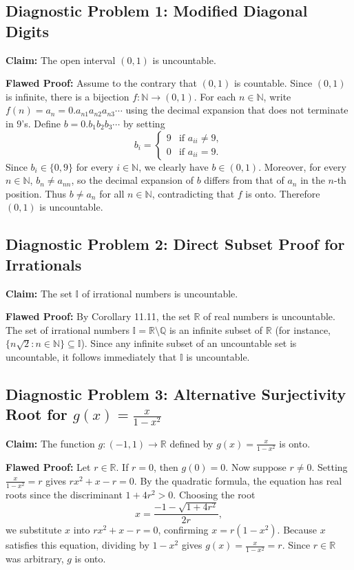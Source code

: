 \documentclass[11pt, letterpaper]{article}
\theoremstyle{definition}
\theoremstyle{remark}
\begin{document}
\subsection{Diagnostic Problem 1: Modified Diagonal Digits}

\textbf{Claim:} The open interval $(0, 1)$ is uncountable.

\textbf{Flawed Proof:}
Assume to the contrary that $(0, 1)$ is countable. Since $(0, 1)$ is infinite, there is a bijection $f : \mathbb{N} \to (0, 1)$. For each $n \in \mathbb{N}$, write $f(n) = a_n = 0.a_{n1} a_{n2} a_{n3} \cdots$ using the decimal expansion that does not terminate in $9$'s. Define $b = 0.b_1 b_2 b_3 \cdots$ by setting
\[
b_i = \begin{cases}
9 & \text{if } a_{ii} \neq 9, \\
0 & \text{if } a_{ii} = 9.
\end{cases}
\]
Since $b_i \in \{0, 9\}$ for every $i \in \mathbb{N}$, we clearly have $b \in (0, 1)$. Moreover, for every $n \in \mathbb{N}$, $b_n \neq a_{nn}$, so the decimal expansion of $b$ differs from that of $a_n$ in the $n$-th position. Thus $b \neq a_n$ for all $n \in \mathbb{N}$, contradicting that $f$ is onto. Therefore $(0, 1)$ is uncountable.

\subsection{Diagnostic Problem 2: Direct Subset Proof for Irrationals}

\textbf{Claim:} The set $\mathbb{I}$ of irrational numbers is uncountable.

\textbf{Flawed Proof:}
By Corollary 11.11, the set $\mathbb{R}$ of real numbers is uncountable. The set of irrational numbers $\mathbb{I} = \mathbb{R} \setminus \mathbb{Q}$ is an infinite subset of $\mathbb{R}$ (for instance, $\{n\sqrt{2} : n \in \mathbb{N}\} \subseteq \mathbb{I}$). Since any infinite subset of an uncountable set is uncountable, it follows immediately that $\mathbb{I}$ is uncountable.

\subsection{Diagnostic Problem 3: Alternative Surjectivity Root for $g(x) = \frac{x}{1 - x^2}$}

\textbf{Claim:} The function $g : (-1, 1) \to \mathbb{R}$ defined by $g(x) = \frac{x}{1 - x^2}$ is onto.

\textbf{Flawed Proof:}
Let $r \in \mathbb{R}$. If $r = 0$, then $g(0) = 0$. Now suppose $r \neq 0$. Setting $\frac{x}{1 - x^2} = r$ gives $rx^2 + x - r = 0$. By the quadratic formula, the equation has real roots since the discriminant $1 + 4r^2 > 0$. Choosing the root
\[
x = \frac{-1 - \sqrt{1 + 4r^2}}{2r},
\]
we substitute $x$ into $rx^2 + x - r = 0$, confirming $x = r(1 - x^2)$. Because $x$ satisfies this equation, dividing by $1 - x^2$ gives $g(x) = \frac{x}{1 - x^2} = r$. Since $r \in \mathbb{R}$ was arbitrary, $g$ is onto.
\end{document}
